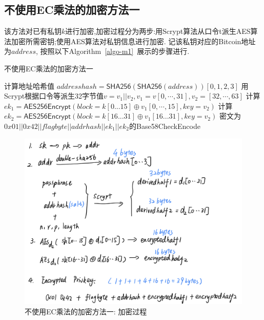 \subsection{不使用EC乘法的加密方法一}

该方法对已有私钥$k$进行加密,加密过程分为两步:用Scrypt算法从口令t派生AES算法加密所需密钥;使用AES算法对私钥信息进行加密.
记该私钥对应的Bitcoin地址为$address$, 按照以下Algorithm~\ref{algo-m1}~展示的步骤进行.

\begin{algorithm}[h]\footnotesize
\caption{不使用EC乘法的加密方法一}\label{algo-m1}
\begin{algorithmic}[1]
	    	\STATE 计算地址哈希值 $addresshash = \textsf{SHA256}(\textsf{SHA256}(address))[0,1,2,3]$
		\STATE 用Scrypt根据口令等派生32字节值$v=v_1||v_2, v_1 = v[0,\cdots, 31], v_2= [32,\cdots,63]$
		\STATE 计算$ek_1 = \textsf{AES256Encrypt}(block = k[0...15] \oplus v_1[0,\cdots,15], key = v_2)$
		\STATE 计算$ek_2 = \textsf{AES256Encrypt}(block = k[16...31] \oplus v_1[16...31], key = v_2)$
		\STATE 密文为$0x01 || 0x42 || flagbyte || addrhash || ek_1 || ek_2$的\textsf{Base58CheckEncode}
\end{algorithmic}
\end{algorithm}




\begin{figure}[h]
\centering
\includegraphics[width=.7\textwidth]{./no-ec.png}
\caption{不使用EC乘法的加密方法一: 加密过程}\label{fig-m1-enc}
\end{figure}

